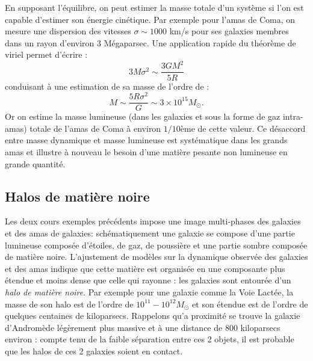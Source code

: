 En supposant l'équilibre, on peut estimer la masse totale d'un système si l'on est capable d'estimer son énergie cinétique. Par exemple pour l'amas de Coma, on mesure une dispersion des vitesses $\sigma \sim 1000$ km/s pour ses galaxies membres dans un rayon d'environ 3 Mégaparsec. Une application rapide du théorème de viriel permet d'écrire  :
\begin{equation}
3M\sigma^2\sim \frac{3GM^2}{5R}
\end{equation}
conduisant à une estimation de sa masse de l'ordre de :
\begin{equation}
M\sim\frac{5R\sigma^2}{G}\sim 3\times 10^{15} M_\odot.
\end{equation}
Or on estime la masse lumineuse (dans les galaxies et sous la forme de gaz intra-amas) totale de l'amas de Coma à environ $1/10$ème de cette valeur. Ce désaccord entre masse dynamique et masse lumineuse est systématique dans les grands amas et illustre à nouveau le besoin d'une matière pesante non lumineuse en grande quantité.

\subsection{Halos de matière noire}

Les deux cours exemples précédents impose une image multi-phases des galaxies et des amas de galaxies: schématiquement une galaxie se compose d'une partie lumineuse composée d'étoiles, de gaz, de poussière et une partie sombre composée de matière noire. L'ajustement de modèles sur la dynamique observée des galaxies et des amas indique que cette matière est organisée en une composante plus étendue et moins dense que celle qui rayonne : les galaxies sont entourée d'un \textit{halo de matière noire}. Par exemple pour une galaxie comme la Voie Lactée, la masse de son halo est de l'ordre de $10^{11}-10^{12} M_\odot$ et son étendue est de l'ordre de quelques centaines de kiloparsecs. Rappelons qu'a proximité se trouve la galaxie d'Andromède légèrement plus massive et à une distance de 800 kiloparsecs environ : compte tenu de la faible séparation entre ces 2 objets, il est probable que les halos de ces 2 galaxies soient en contact.

